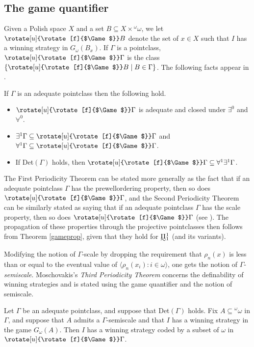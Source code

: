 \documentclass{book}%
\newcommand{\game}{\rotate[u]{\rotate[f]{$\Game$}}}
\newcommand{\breals}{{^{\omega}}\omega}
\def\underTilde#1{{\baselineskip=0pt\vtop{\hbox{$#1$}\hbox{$\sim$}}}{}}
\newcommand{\uTPi}{\underTilde{\Pi}}
\begin{document}
\subsection{The game quantifier}\label{gameqsec}

Given a Polish space $X$ and a set $B \subseteq X \times \breals$, we let $\game B$ denote the set of $x \in X$ such that $I$ has a winning
strategy in $G_{\omega}(B_{x})$. If $\Gamma$ is a pointclass, $\game
\Gamma$ is the class $\{ \game B \mid B \in \Gamma\}$. The following facts
appear in \cite[pp.~245-246]{Moschovakis:DST09}.

\begin{theorem}\label{gameprop} If\/ $\Gamma$ is an adequate pointclass then the following hold.
\begin{itemize}
\item $\game \Gamma$ is adequate and closed under $\exists^{0}$ and $\forall^{0}$.
\item $\exists^{1}\Gamma \subseteq \game \Gamma$ and $\forall^{1}\Gamma \subseteq \game \Gamma$.
\item If {\rm Det}$(\Gamma)$ holds, then $\game \Gamma \subseteq \forall^{1}\exists^{1}\Gamma$.
\end{itemize}
\end{theorem}


The First Periodicity
Theorem can be stated more generally as the fact that if an adequate
pointclass $\Gamma$ has the prewellordering property, then so does
$\game\Gamma$, and the Second Periodicity Theorem can be similarly
stated as saying that if an adequate pointclass $\Gamma$ has the
scale property, then so does $\game\Gamma$ (see \cite[pp.~246,267]{Moschovakis:DST09}).
The propagation of these properties through the
projective pointclasses then follows from Theorem \ref{gameprop}, given that
they hold for $\uTPi^{1}_{1}$ (and its variants).

Modifying the notion of $\Gamma$-scale by dropping the requirement that $\rho_{n}(x)$ is less than or equal to
the eventual value of $\langle \rho_{n}(x_{i}) : i \in \omega
\rangle$, one gets the notion of
$\Gamma$-\emph{semiscale}. Moschovakis's
\emph{Third Periodicity Theorem}  concerns the
definability of winning strategies and is stated using the game
quantifier and the notion of semiscale.

\begin{theorem}
Let $\Gamma$ be an adequate pointclass, and suppose that {\rm Det}$(\Gamma)$ holds.
Fix $A \subseteq \breals$ in $\Gamma$, and suppose that $A$ admits a
$\Gamma$-semiscale and that $I$ has a winning strategy in the game
$G_{\omega}(A)$. Then $I$ has a winning strategy coded by a subset of $\omega$ in $\game \Gamma$.
\end{theorem}
\end{document}
